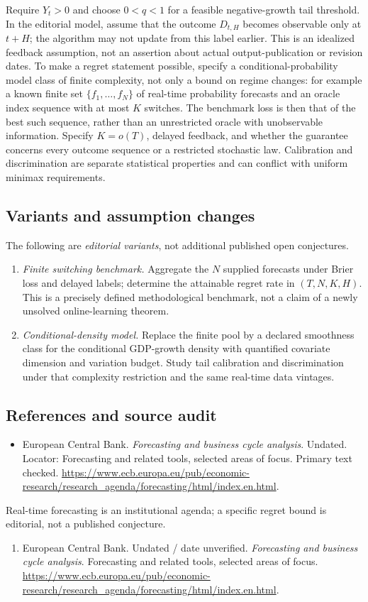 \documentclass[11pt,a4paper]{article}
\begin{document}
Require \(Y_t>0\) and choose \(0<q<1\) for a feasible negative-growth tail threshold. In the editorial model, assume that the outcome \(D_{t,H}\) becomes observable only at \(t+H\); the algorithm may not update from this label earlier. This is an idealized feedback assumption, not an assertion about actual output-publication or revision dates. To make a regret statement possible, specify a conditional-probability model class of finite complexity, not only a bound on regime changes: for example a known finite set \(\{f_1,\ldots,f_N\}\) of real-time probability forecasts and an oracle index sequence with at most \(K\) switches. The benchmark loss is then that of the best such sequence, rather than an unrestricted oracle with unobservable information. Specify \(K=o(T)\), delayed feedback, and whether the guarantee concerns every outcome sequence or a restricted stochastic law. Calibration and discrimination are separate statistical properties and can conflict with uniform minimax requirements.
\subsection*{Variants and assumption changes}
The following are \emph{editorial variants}, not additional published open conjectures.
\begin{enumerate}
\item \emph{Finite switching benchmark.} Aggregate the \(N\) supplied forecasts under Brier loss and delayed labels; determine the attainable regret rate in \((T,N,K,H)\). This is a precisely defined methodological benchmark, not a claim of a newly unsolved online-learning theorem.
\item \emph{Conditional-density model.} Replace the finite pool by a declared smoothness class for the conditional GDP-growth density with quantified covariate dimension and variation budget. Study tail calibration and discrimination under that complexity restriction and the same real-time data vintages.
\end{enumerate}
\subsection*{References and source audit}
\begin{itemize}
\item European Central Bank. \emph{Forecasting and business cycle analysis}. Undated. Locator: Forecasting and related tools, selected areas of focus. Primary text checked. \url{https://www.ecb.europa.eu/pub/economic-research/research_agenda/forecasting/html/index.en.html}.
\end{itemize}
Real-time forecasting is an institutional agenda; a specific regret bound is editorial, not a published conjecture.
\begin{enumerate}\raggedright
\item\hypertarget{definitions:source:30007520:1}{} European Central Bank. Undated / date unverified. \emph{Forecasting and business cycle analysis}. Forecasting and related tools, selected areas of focus.
\url{https://www.ecb.europa.eu/pub/economic-research/research_agenda/forecasting/html/index.en.html}.
\end{enumerate}
\end{document}
